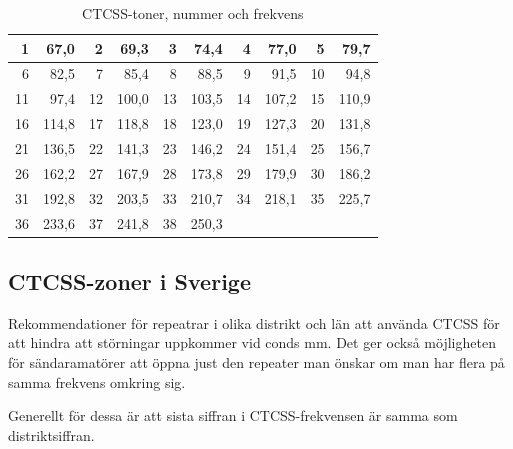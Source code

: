 \begin{table}[H]
\centering
\begin{tabular}{rr|rr|rr|rr|rr}
	 1 &  67,0 &  2 &  69,3 &  3 &  74,4 &  4 &  77,0 &  5 &  79,7 \\ \hline
	 6 &  82,5 &  7 &  85,4 &  8 &  88,5 &  9 &  91,5 & 10 &  94,8 \\ \hline
	11 &  97,4 & 12 & 100,0 & 13 & 103,5 & 14 & 107,2 & 15 & 110,9 \\ \hline
	16 & 114,8 & 17 & 118,8 & 18 & 123,0 & 19 & 127,3 & 20 & 131,8 \\ \hline
	21 & 136,5 & 22 & 141,3 & 23 & 146,2 & 24 & 151,4 & 25 & 156,7 \\ \hline
	26 & 162,2 & 27 & 167,9 & 28 & 173,8 & 29 & 179,9 & 30 & 186,2 \\ \hline
	31 & 192,8 & 32 & 203,5 & 33 & 210,7 & 34 & 218,1 & 35 & 225,7 \\ \hline
	36 & 233,6 & 37 & 241,8 & 38 & 250,3 &    &       &    &
\end{tabular}
\caption{CTCSS-toner, nummer och frekvens}
\end{table}

\subsection{CTCSS-zoner i Sverige}

Rekommendationer för repeatrar i olika distrikt och län att använda CTCSS för att hindra att störningar uppkommer vid conds mm. Det ger också möjligheten för sändaramatörer att öppna just den repeater man önskar om man har flera på samma frekvens omkring sig.

Generellt för dessa är att sista siffran i CTCSS-frekvensen är samma som distriktsiffran.

